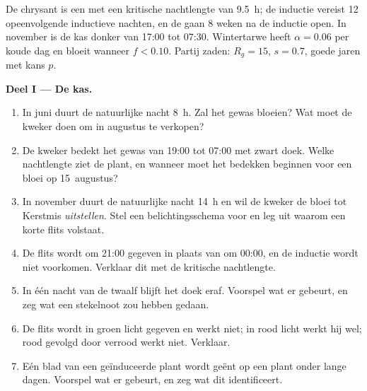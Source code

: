 \begin{problem}
\label{pb:b2:plant-flowering:1}
De chrysant is een  met een kritische nachtlengte van
\qty{9.5}{h}; de inductie vereist \num{12} opeenvolgende inductieve
nachten, en de  gaan \num{8} weken na de inductie open. In november
is de kas donker van 17:00 tot 07:30. Wintertarwe
heeft $\alpha = 0.06$ per koude dag en bloeit wanneer $f < 0.10$. Partij
zaden: $R_g = 15$, $s = 0.7$, goede jaren met kans $p$.

\medskip
\noindent\textbf{Deel I --- De kas.}
\begin{enumerate}
  \item In juni duurt de natuurlijke nacht \qty{8}{h}. Zal het gewas
        bloeien? Wat moet de kweker doen om in augustus  te verkopen?
  \item De kweker bedekt het gewas van 19:00 tot 07:00 met zwart doek. Welke
        nachtlengte ziet de plant, en wanneer moet het bedekken beginnen voor
        een bloei op 15~augustus?
  \item In november duurt de natuurlijke nacht \qty{14}{h} en wil de kweker
        de bloei tot Kerstmis \emph{uitstellen}. Stel een belichtingsschema
        voor en leg uit waarom een korte flits volstaat.
  \item De flits wordt om 21:00 gegeven in plaats van om 00:00, en de
        inductie wordt niet voorkomen. Verklaar dit met de kritische
        nachtlengte.
  \item In één nacht van de twaalf blijft het doek eraf. Voorspel wat er
        gebeurt, en zeg wat een stekelnoot zou hebben gedaan.
  \item De flits wordt in groen licht gegeven en werkt niet; in rood licht
        werkt hij wel; rood gevolgd door verrood werkt niet. Verklaar.
  \item Eén blad van een geïnduceerde plant wordt geënt op een plant onder
        lange dagen. Voorspel wat er gebeurt, en zeg wat dit identificeert.
\end{enumerate}


\end{problem}
